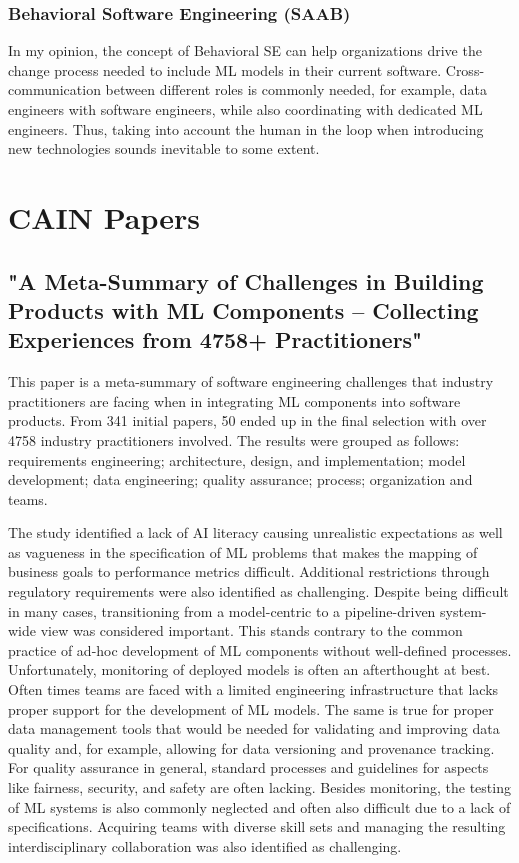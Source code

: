 \documentclass[titlepage,11pt]{article}
\begin{document}
\subsubsection{Behavioral Software Engineering (SAAB)}
In my opinion, the concept of Behavioral SE can help organizations drive the change process needed to include ML models in their current software. Cross-communication between different roles is commonly needed, for example, data engineers with software engineers, while also coordinating with dedicated ML engineers. Thus, taking into account the human in the loop when introducing new technologies sounds inevitable to some extent.

\section{CAIN Papers}
\subsection{"A Meta-Summary of Challenges in Building Products with ML Components – Collecting Experiences from 4758+ Practitioners"~\cite{naharMetaSummaryChallengesBuilding2023}}
This paper is a meta-summary of software engineering challenges that industry practitioners are facing when in integrating ML components into software products. From 341 initial papers, 50 ended up in the final selection with over 4758 industry practitioners involved. The results were grouped as follows: requirements engineering; architecture, design, and implementation; model development; data engineering; quality assurance; process; organization and teams.

The study identified a lack of AI literacy causing unrealistic expectations as well as vagueness in the specification of ML problems that makes the mapping of business goals to performance metrics difficult. Additional restrictions through regulatory requirements were also identified as challenging. Despite being difficult in many cases, transitioning from a model-centric to a pipeline-driven system-wide view was considered important. This stands contrary to the common practice of ad-hoc development of ML components without well-defined processes. Unfortunately, monitoring of deployed models is often an afterthought at best. Often times teams are faced with a limited engineering infrastructure that lacks proper support for the development of ML models. The same is true for proper data management tools that would be needed for validating and improving data quality and, for example, allowing for data versioning and provenance tracking. For quality assurance in general, standard processes and guidelines for aspects like fairness, security, and safety are often lacking. Besides monitoring, the testing of ML systems is also commonly neglected and often also difficult due to a lack of specifications. Acquiring teams with diverse skill sets and managing the resulting interdisciplinary collaboration was also identified as challenging.
\end{document}

